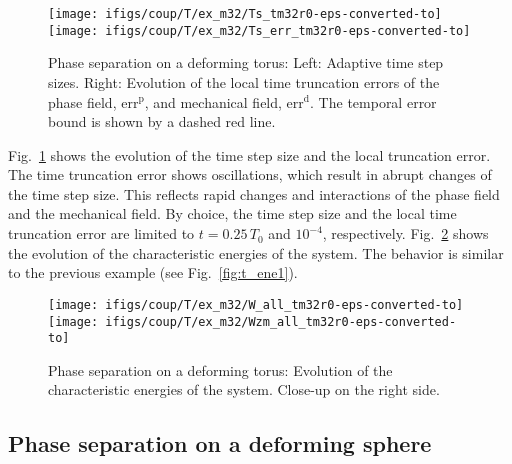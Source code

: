 \documentclass[11pt]{article}
\begin{document}
\begin{figure}[H]
\centering
\texttt{[image: ifigs/coup/T/ex\_m32/Ts\_tm32r0-eps-converted-to]}
\texttt{[image: ifigs/coup/T/ex\_m32/Ts\_err\_tm32r0-eps-converted-to]}
\caption{Phase separation on a deforming torus: Left: Adaptive time step sizes. Right: Evolution of the local time truncation errors of the phase field, $\mathrm{err}^\mathrm{p}$, and mechanical field, $\mathrm{err}^\mathrm{d}$. The temporal error bound is shown by a dashed red line.}
\label{fig:t_ts2}
\end{figure}
Fig.~\ref{fig:t_ts2} shows the evolution of the time step size and the local truncation error. The time truncation error shows oscillations, which result in abrupt changes of the time step size. 
This reflects rapid changes and interactions of the phase field and the mechanical field. 
By choice, the time step size and the local time truncation error are limited to $t=0.25\,T_0$ and $10^{-4}$, respectively. Fig.~\ref{fig:t_ene2} shows the evolution of the characteristic energies of the system. 
The behavior is similar to the previous example (see Fig.~\ref{fig:t_ene1}).
\begin{figure}[H]
\centering
\texttt{[image: ifigs/coup/T/ex\_m32/W\_all\_tm32r0-eps-converted-to]}
\texttt{[image: ifigs/coup/T/ex\_m32/Wzm\_all\_tm32r0-eps-converted-to]}
\caption{Phase separation on a deforming torus: Evolution of the characteristic energies of the system. Close-up on the right side.}
\label{fig:t_ene2}
\end{figure}


\subsection{Phase separation on a deforming sphere}
\end{document}
